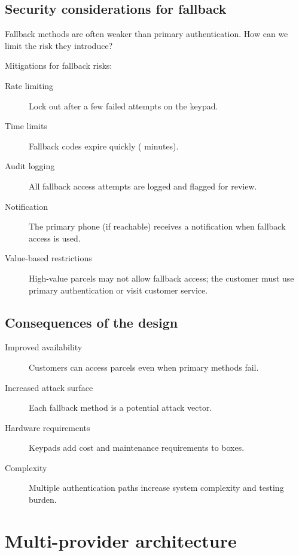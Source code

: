 \subsection{Security considerations for fallback}

\begin{exercise}
  Fallback methods are often weaker than primary authentication.
  How can we limit the risk they introduce?
\end{exercise}

Mitigations for fallback risks:
\begin{description}
  \item[Rate limiting] Lock out after a few failed attempts on the
    keypad.
  \item[Time limits] Fallback codes expire quickly ( minutes).
  \item[Audit logging] All fallback access attempts are logged and
    flagged for review.
  \item[Notification] The primary phone (if reachable) receives a
    notification when fallback access is used.
  \item[Value-based restrictions] High-value parcels may not allow
    fallback access; the customer must use primary authentication or visit
    customer service.
\end{description}

\subsection{Consequences of the design}

\begin{description}
  \item[Improved availability] Customers can access parcels even when primary 
    methods fail.
  \item[Increased attack surface] Each fallback method is a potential attack 
    vector.
  \item[Hardware requirements] Keypads add cost and maintenance requirements to 
    boxes.
  \item[Complexity] Multiple authentication paths increase system complexity 
    and testing burden.
\end{description}


\section{Multi-provider architecture}\label{MultiProvider}

